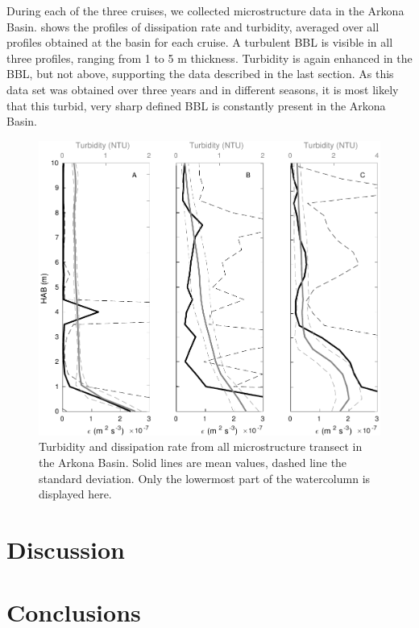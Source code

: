 During each of the three cruises, we collected microstructure data in the 
Arkona Basin.  shows the profiles of dissipation rate and turbidity, 
averaged over all profiles obtained at the basin for each cruise. A turbulent 
BBL is visible in all three profiles, ranging from 1 to 5 m thickness. 
Turbidity is again enhanced in the BBL, but not above, supporting the data 
described in the last section. As this data set was obtained over three years 
and in different seasons, it is most likely that this turbid, very sharp 
defined BBL is constantly present in the Arkona Basin.
   \begin{figure}[ht]
\includegraphics[width=15cm]{bilder/arkona_mss.pdf}
 \caption{Turbidity and dissipation rate from all microstructure transect in 
the Arkona Basin. Solid lines are mean values, dashed line the standard 
deviation. Only the lowermost part of the watercolumn is displayed here.}
 \label{abmss}
 \end{figure}
 
\section{Discussion}

\section{Conclusions}